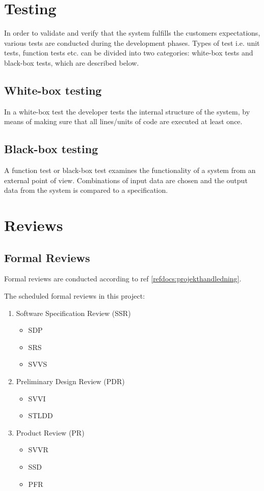 \documentclass[a4paper]{article}
\begin{document}
\section{Testing}
In order to validate and verify that the system fulfills the customers expectations, various tests are conducted during the development phases. Types of test i.e. unit tests, function tests etc. can be divided into two categories: white-box tests and black-box tests, which are described below.   

\subsection{White-box testing}
In a white-box test the developer tests the internal structure of the system, by means of making sure that all lines/units of code are executed at least once.

\subsection{Black-box testing}
A function test or black-box test examines the functionality of a system from an external point of view. Combinations of input data are chosen and the output data from the system is compared to a specification.


\section{Reviews}

\subsection{Formal Reviews}
Formal reviews are conducted according to ref \ref{refdocs:projekthandledning}.

The scheduled formal reviews in this project:

\begin{enumerate}

\item Software Specification Review (SSR)
\begin{itemize}
\item SDP
\item SRS
\item SVVS
\end{itemize}


\item Preliminary Design Review (PDR)
\begin{itemize}
\item SVVI
\item STLDD
\end{itemize}


\item Product Review (PR)
\begin{itemize}
\item SVVR
\item SSD
\item PFR
\end{itemize}


\end{enumerate}
\end{document}
